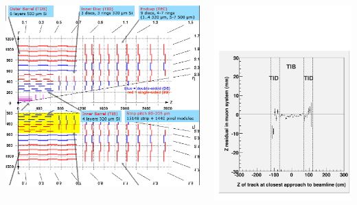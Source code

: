 \documentclass[compress]{beamer}
\begin{document}
\begin{frame}
\begin{columns}
\includegraphics[width=\linewidth]{tracker_map_innerbottom.png}

\includegraphics[width=\linewidth]{zresid_from_tracker_innertop.pdf}


\end{columns}
\end{frame}
\end{document}
